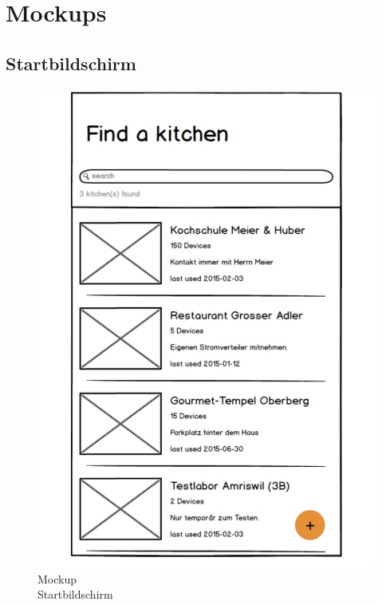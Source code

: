 
\section{Mockups}
\label{sec:Mockups}

\subsection{Startbildschirm}
\label{subsec:Startbildschirm}

\begin{figure}
	\begin{center}
	    \vspace{-1cm}
		\includegraphics[page=1,trim=0 0 0 0,clip,scale=0.21]{uiux/res/mockups}
		\caption{Mockup\\Startbildschirm}
	    \label{abb:mockStartScreen}
	\end{center}
\end{figure}

